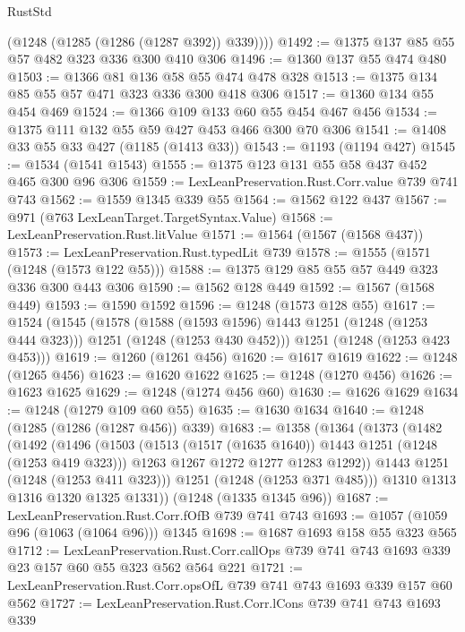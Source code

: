 \begin{lexlean}{RustStd}
\begin{coremodule}
        (@1248 (@1285 (@1286 (@1287 @392)) @339))))
@1492 := @1375 @137 @85 @55 @57 @482 @323 @336 @300 @410 @306
@1496 := @1360 @137 @55 @474 @480
@1503 := @1366 @81 @136 @58 @55 @474 @478 @328
@1513 := @1375 @134 @85 @55 @57 @471 @323 @336 @300 @418 @306
@1517 := @1360 @134 @55 @454 @469
@1524 := @1366 @109 @133 @60 @55 @454 @467 @456
@1534 := @1375 @111 @132 @55 @59 @427 @453 @466 @300 @70 @306
@1541 := @1408 @33 @55 @33 @427 (@1185 (@1413 @33))
@1543 := @1193 (@1194 @427)
@1545 := @1534 (@1541 @1543)
@1555 := @1375 @123 @131 @55 @58 @437 @452 @465 @300 @96 @306
@1559 := LexLeanPreservation.Rust.Corr.value @739 @741 @743
@1562 := @1559 @1345 @339 @55
@1564 := @1562 @122 @437
@1567 := @971 (@763 LexLeanTarget.TargetSyntax.Value)
@1568 := LexLeanPreservation.Rust.litValue
@1571 := @1564 (@1567 (@1568 @437))
@1573 := LexLeanPreservation.Rust.typedLit @739
@1578 := @1555 (@1571 (@1248 (@1573 @122 @55)))
@1588 := @1375 @129 @85 @55 @57 @449 @323 @336 @300 @443 @306
@1590 := @1562 @128 @449
@1592 := @1567 (@1568 @449)
@1593 := @1590 @1592
@1596 := @1248 (@1573 @128 @55)
@1617 := @1524
    (@1545
      (@1578
        (@1588 (@1593 @1596) @1443 @1251 (@1248 (@1253 @444 @323)))
        @1251
        (@1248 (@1253 @430 @452)))
      @1251
      (@1248 (@1253 @423 @453)))
@1619 := @1260 (@1261 @456)
@1620 := @1617 @1619
@1622 := @1248 (@1265 @456)
@1623 := @1620 @1622
@1625 := @1248 (@1270 @456)
@1626 := @1623 @1625
@1629 := @1248 (@1274 @456 @60)
@1630 := @1626 @1629
@1634 := @1248 (@1279 @109 @60 @55)
@1635 := @1630 @1634
@1640 := @1248 (@1285 (@1286 (@1287 @456)) @339)
@1683 := @1358
    (@1364
      (@1373
        (@1482
          (@1492
            (@1496
              (@1503
                (@1513 (@1517 (@1635 @1640)) @1443 @1251 (@1248 (@1253 @419 @323)))
                @1263
                @1267
                @1272
                @1277
                @1283
                @1292))
            @1443
            @1251
            (@1248 (@1253 @411 @323)))
          @1251
          (@1248 (@1253 @371 @485)))
        @1310
        @1313
        @1316
        @1320
        @1325
        @1331))
    (@1248 (@1335 @1345 @96))
@1687 := LexLeanPreservation.Rust.Corr.fOfB @739 @741 @743
@1693 := @1057 (@1059 @96 (@1063 (@1064 @96))) @1345
@1698 := @1687 @1693 @158 @55 @323 @565
@1712 := LexLeanPreservation.Rust.Corr.callOps
    @739
    @741
    @743
    @1693
    @339
    @23
    @157
    @60
    @55
    @323
    @562
    @564
    @221
@1721 := LexLeanPreservation.Rust.Corr.opsOfL @739 @741 @743 @1693 @339 @157 @60 @562
@1727 := LexLeanPreservation.Rust.Corr.lCons @739 @741 @743 @1693 @339

\end{coremodule}
\end{lexlean}
